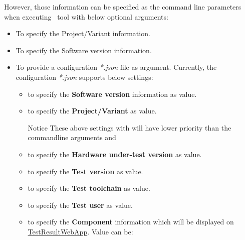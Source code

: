 However, those information can be specified as the command line parameters 
when executing \pkg\ tool with below optional arguments:

\begin{itemize}
\item {}

  To specify the {Project/Variant} information.
  
\item {}

  To specify the {Software version} information.

\item {}

  To provide a configuration \emph{*.json} file as  argument.
  Currently, the configuration \emph{*.json} supports below settings:

  \begin{itemize}
  \item {} to specify the \textbf{Software version} information as  
        value.
  \item {} to specify the \textbf{Project/Variant} as  value.
  \begin{boxhint} {Notice}
    These above settings with  will have lower priority than the 
    commandline arguments  and 
  \end{boxhint}
  \item {} to specify the \textbf{Hardware under-test version} as  value.
  \item {} to specify the \textbf{Test version} as  value.
  \item {} to specify the \textbf{Test toolchain} as  value.
  \item {} to specify the \textbf{Test user} as  value.
  \item {} to specify the \textbf{Component} information which will be 
        displayed on \href{https://github.com/test-fullautomation/testresultwebapp}
        {TestResultWebApp}. Value can be:


\end{itemize}
\end{itemize}
